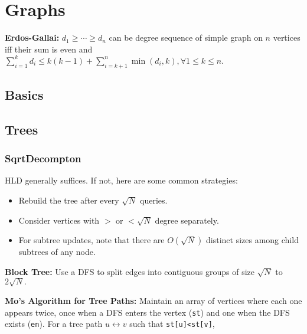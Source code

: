 \chapter{Graphs}

\textbf{Erdos-Gallai:} $d_1\geq\cdots\geq d_n$ can be degree sequence of simple graph on $n$ vertices iff their sum is even and $\sum_{i=1}^{k}d_{i}\leq k(k-1)+\sum _{i=k+1}^{n}\min(d_{i},k), \forall 1\le k\le n.$

\section{Basics}


\section{Trees}

	\subsection{SqrtDecompton}

		HLD generally suffices. If not, here are some common strategies:
		
		\begin{itemize}
			\item Rebuild the tree after every $\sqrt N$ queries. %
			\item Consider vertices with $>$ or $<\sqrt N$ degree separately. %
			\item For subtree updates, note that there are $O(\sqrt N)$ distinct sizes among child subtrees of any node.
		\end{itemize}

		\textbf{Block Tree:} Use a DFS to split edges into contiguous groups of size $\sqrt N$ to $2\sqrt N.$

		\textbf{Mo's Algorithm for Tree Paths:} Maintain an array of vertices where each one appears twice, once when a DFS enters the vertex (\texttt{st}) and one when the DFS exists (\texttt{en}). For a tree path $u\leftrightarrow v$ such that \texttt{st[u]<st[v]},

